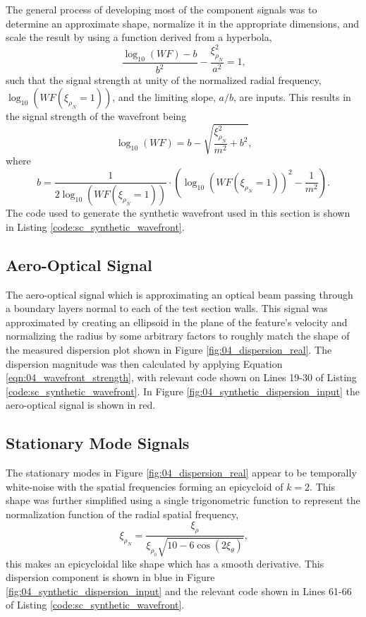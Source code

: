 The general process of developing most of the component signals was to determine an approximate shape, normalize it in the appropriate dimensions, and scale the result by using a function derived from a hyperbola,
\begin{equation}
 \frac{\log_{10}(WF)-b}{b^2}-\frac{\xi_{\rho_N}^2}{a^2} = 1 \textrm{,}
 \label{eqn:04_scaling_hyperbola}
\end{equation}
such that the signal strength at unity of the normalized radial frequency, $\log_{10}(WF(\xi_{\rho_N}=1))$, and the limiting slope, $a/b$, are inputs.
This results in the signal strength of the wavefront being
\begin{equation}
 \log_{10}(WF) = b-\sqrt{\frac{\xi_{\rho_N}^2}{m^2}+b^2} \textrm{,}
 \label{eqn:04_wavefront_strength}
\end{equation}
where
\begin{equation}
 b = \frac{1}{2\log_{10}(WF(\xi_{\rho_N}=1))}\cdot\left(\log_{10}(WF(\xi_{\rho_N}=1))^2-\frac{1}{m^2}\right) \textrm{.}
 \label{eqn:04_wavefront_strength_b}
\end{equation}
The code used to generate the synthetic wavefront used in this section is shown in Listing \ref{code:sc_synthetic_wavefront}.

\subsection{Aero-Optical Signal}
The aero-optical signal which is approximating an optical beam passing through a boundary layers normal to each of the test section walls.
This signal was approximated by creating an ellipsoid in the plane of the feature's velocity and normalizing the radius by some arbitrary factors to roughly match the shape of the measured dispersion plot shown in Figure \ref{fig:04_dispersion_real}.
The dispersion magnitude was then calculated by applying Equation \ref{eqn:04_wavefront_strength}, with relevant code shown on Lines 19-30 of Listing \ref{code:sc_synthetic_wavefront}.
In Figure \ref{fig:04_synthetic_dispersion_input} the aero-optical signal is shown in red.

\subsection{Stationary Mode Signals}
The stationary modes in Figure \ref{fig:04_dispersion_real} appear to be temporally white-noise with the spatial frequencies forming an epicycloid of $k=2$.
This shape was further simplified using a single trigonometric function to represent the normalization function of the radial spatial frequency,
\begin{equation}
 \xi_{\rho_N} = \frac{\xi_\rho}{\xi_{\rho_0}\sqrt{10-6\cos{(2\xi_\theta)}}} \textrm{,}
\end{equation}
this makes an epicycloidal like shape which has a smooth derivative.
This dispersion component is shown in blue in Figure \ref{fig:04_synthetic_dispersion_input} and the relevant code shown in Lines 61-66 of Listing \ref{code:sc_synthetic_wavefront}.

